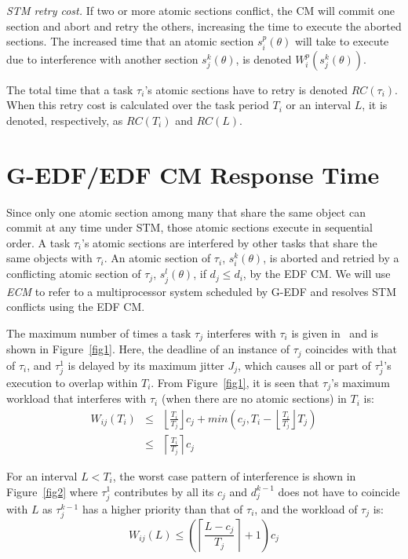 \documentclass{sig-alternate}
\begin{document}
\textit{STM retry cost.} If two or more atomic sections conflict, the CM will commit one section and abort and retry the others, increasing the time to execute the aborted sections. The increased time that an atomic section $s_i^p (\theta)$ will take to execute due to interference with another section $s_j^k (\theta)$, is denoted $W_{i}^{p}(s_{j}^{k}(\theta))$. 

The total time that a task $\tau_i$'s atomic sections have to retry is denoted $RC(\tau_i)$.
When this retry cost is calculated over the task period $T_i$ or an interval $L$, it is   denoted, respectively, as $RC(T_i)$ and $RC(L)$. 

\section{G-EDF/EDF CM Response Time}
\label{sec:g-edf-edf-cm}

Since only one atomic section among many that share the same object can commit at any time under STM, those atomic sections execute in sequential order.  A task $\tau_{i}$'s atomic sections are interfered by other tasks that share the same objects with $\tau_{i}$. An atomic section of $\tau_i$, $s_i^k(\theta)$, is aborted and retried by a conflicting atomic section of $\tau_j$, $s_j^l(\theta)$, if $d_j \le d_i$, by the EDF CM. We will use \emph{ECM} to refer to a multiprocessor system scheduled by G-EDF and resolves STM conflicts using the EDF CM. 



The maximum number of times a task $\tau_{j}$ interferes with $\tau_{i}$ is given in~\cite{key-2} and is shown in Figure~\ref{fig1}. 
Here, the deadline of an instance of $\tau_{j}$ coincides
with that of $\tau_{i}$, and $\tau_{j}^{1}$ is delayed by its maximum
jitter $J_{j}$, which causes all or part of $\tau_{j}^1$'s execution to overlap within $T_i$. From Figure~\ref{fig1}, it is seen that $\tau_{j}$'s maximum workload that interferes with $\tau_{i}$ (when there are no atomic sections) in $T_{i}$ is:
\begin{eqnarray}
W_{ij}\left(T_{i}\right) & \le & \left\lfloor\frac{T_{i}}{T_{j}}\right\rfloor c_{j}+min\left(c_{j},T_{i}-\left\lfloor\frac{T_{i}}{T_{j}}\right\rfloor T_{j}\right)\nonumber \\
 & \le & \left\lceil\frac{T_{i}}{T_{j}}\right\rceil c_{j}\label{eq11}\end{eqnarray}

For an interval $L<T_{i}$, the worst case pattern of interference is shown in Figure~\ref{fig2} where $\tau_{j}^{1}$ contributes by all its $c_j$ and $d_j^{k-1}$ does not have to coincide with $L$ as $\tau_j^{k-1}$ has a higher priority than that of $\tau_{i}$, and the workload of $\tau_{j}$ is:
\begin{equation}
W_{ij}\left(L\right)\le \left(\left\lceil\frac{L-c_{j}}{T_{j}}\right\rceil +1\right)c_{j}
\label{eq12}\end{equation}
\end{document}

